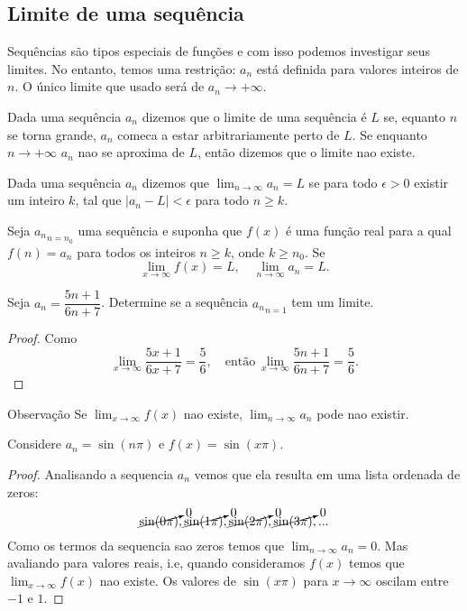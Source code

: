    \subsection{Limite de uma sequência}
      Sequências são tipos especiais de funções e com isso podemos investigar seus
      limites. No entanto, temos uma restrição: ${a_{n}}$ está definida para
      valores inteiros de $n$. O único limite que usado será de $a_{n} \to
      +\infty.$
      \begin{definition}[Intuitiva]
         Dada uma sequência ${a_{n}}$ dizemos que o limite de uma sequência é
         $L$ se, equanto $n$ se torna grande, $a_{n}$ comeca a estar
         arbitrariamente perto de $L$. Se enquanto $n \to +\infty$ $a_{n}$ nao
         se aproxima de $L$, então dizemos que o limite nao existe.
      \end{definition}
      \begin{definition}
         Dada uma sequência ${a_{n}}$ dizemos que $\lim_{n\to\infty} a_{n} = L$
         se para todo $\epsilon > 0$ existir um inteiro $k$, tal que $| a_{n} -
         L | < \epsilon$ para todo $n \geq k$.
      \end{definition}
      \begin{theorem}
         Seja ${a_{n}}_{n=n_{0}}$ uma sequência e suponha que $f(x)$ é uma
         função real para a qual $f(n) = a_{n}$ para todos os inteiros $n \geq k$,
         onde $k \geq n_{0}$. Se $$\lim_{x\to\infty} f(x) = L,\quad
         \lim_{n\to\infty} a_{n} = L.$$
      \end{theorem}
      \begin{exmp}
         Seja $a_{n} = \dfrac{5n+1}{6n+7}$. Determine se a sequência
         ${a_{n}}_{n=1}$ tem um limite.
         \begin{proof}
            Como $$\lim_{x\to\infty} \dfrac{5x+1}{6x+7} = \dfrac{5}{6},\quad \textrm{então}\ \lim_{x\to\infty} \dfrac{5n+1}{6n+7} = \dfrac{5}{6}.$$
         \end{proof}
      \end{exmp}
      \begin{mymdframed}{Observação}
         Se $\lim_{x\to\infty} f(x)$ nao existe, $\lim_{n\to\infty} a_{n}$ pode nao existir.
      \end{mymdframed}
      \begin{exmp}
         Considere $a_{n} = \sin(n\pi)$ e $f(x) = \sin(x\pi)$.
         \begin{proof}
            Analisando a sequencia $a_{n}$ vemos que ela resulta em uma lista ordenada de zeros:
            $$\cancelto{0}{\sin(0\pi)}, \cancelto{0}{\sin(1\pi)}, \cancelto{0}{\sin(2\pi)}, \cancelto{0}{\sin(3\pi)}, ...$$
            Como os termos da sequencia sao zeros temos que $\lim_{n\to\infty} a_{n} = 0.$ Mas avaliando para valores reais, i.e, quando consideramos $f(x)$ temos que $\lim_{x\to\infty} f(x)$ nao existe.
            Os valores de $\sin(x\pi)$ para $x\to\infty$ oscilam entre $-1$ e $1$.
         \end{proof}
      \end{exmp}
